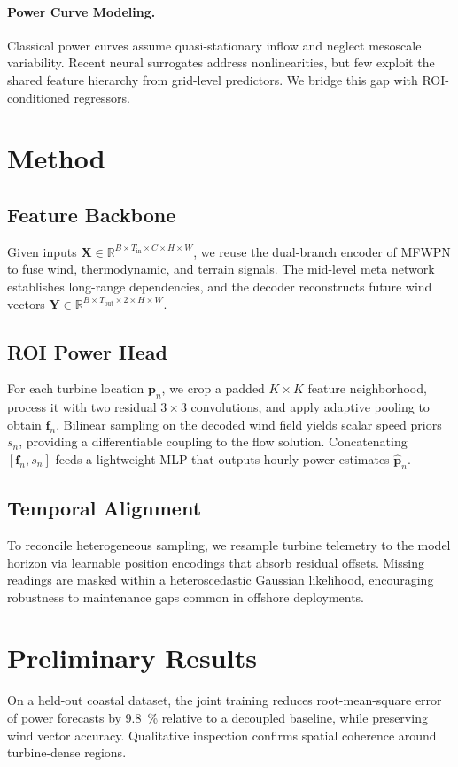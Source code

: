 \documentclass[sigconf]{acmart}
\begin{document}
\paragraph{Power Curve Modeling.} Classical power curves assume quasi-stationary inflow and neglect mesoscale variability. Recent neural surrogates address nonlinearities, but few exploit the shared feature hierarchy from grid-level predictors. We bridge this gap with ROI-conditioned regressors.

\section{Method}
\subsection{Feature Backbone}
Given inputs $\mathbf{X} \in \mathbb{R}^{B\times T_{\text{in}}\times C\times H\times W}$, we reuse the dual-branch encoder of MFWPN to fuse wind, thermodynamic, and terrain signals. The mid-level meta network establishes long-range dependencies, and the decoder reconstructs future wind vectors $\mathbf{Y} \in \mathbb{R}^{B\times T_{\text{out}}\times 2\times H\times W}$.

\subsection{ROI Power Head}
For each turbine location $\mathbf{p}_n$, we crop a padded $K\times K$ feature neighborhood, process it with two residual $3\times3$ convolutions, and apply adaptive pooling to obtain $\mathbf{f}_n$. Bilinear sampling on the decoded wind field yields scalar speed priors $s_n$, providing a differentiable coupling to the flow solution. Concatenating $[\mathbf{f}_n, s_n]$ feeds a lightweight MLP that outputs hourly power estimates $\hat{\mathbf{p}}_n$.

\subsection{Temporal Alignment}
To reconcile heterogeneous sampling, we resample turbine telemetry to the model horizon via learnable position encodings that absorb residual offsets. Missing readings are masked within a heteroscedastic Gaussian likelihood, encouraging robustness to maintenance gaps common in offshore deployments.

\section{Preliminary Results}
On a held-out coastal dataset, the joint training reduces root-mean-square error of power forecasts by \SI{9.8}{\percent} relative to a decoupled baseline, while preserving wind vector accuracy. Qualitative inspection confirms spatial coherence around turbine-dense regions.
\end{document}
